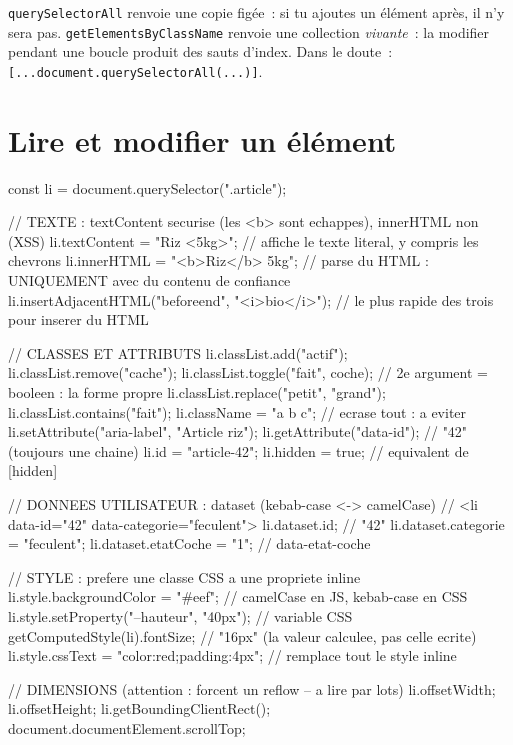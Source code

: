 \begin{note}
\texttt{querySelectorAll} renvoie une copie fig\'ee~: si tu ajoutes un \'el\'ement apr\`es, il n'y sera
pas. \texttt{getElementsByClassName} renvoie une collection \emph{vivante}~: la modifier pendant
une boucle produit des sauts d'index. Dans le doute~: \verb|[...document.querySelectorAll(...)]|.
\end{note}

\section{Lire et modifier un \'el\'ement}

\begin{codejs}
const li = document.querySelector(".article");

// TEXTE : textContent securise (les <b> sont echappes), innerHTML non (XSS)
li.textContent = "Riz <5kg>";              // affiche le texte literal, y compris les chevrons
li.innerHTML = "<b>Riz</b> 5kg";           // parse du HTML : UNIQUEMENT avec du contenu de confiance
li.insertAdjacentHTML("beforeend", "<i>bio</i>");  // le plus rapide des trois pour inserer du HTML

// CLASSES ET ATTRIBUTS
li.classList.add("actif"); li.classList.remove("cache");
li.classList.toggle("fait", coche);         // 2e argument = booleen : la forme propre
li.classList.replace("petit", "grand");
li.classList.contains("fait");
li.className = "a b c";                     // ecrase tout : a eviter
li.setAttribute("aria-label", "Article riz");
li.getAttribute("data-id");                 // "42" (toujours une chaine)
li.id = "article-42";
li.hidden = true;                           // equivalent de [hidden]

// DONNEES UTILISATEUR : dataset (kebab-case <-> camelCase)
// <li data-id="42" data-categorie="feculent">
li.dataset.id;                // "42"
li.dataset.categorie = "feculent";
li.dataset.etatCoche = "1";   // data-etat-coche

// STYLE : prefere une classe CSS a une propriete inline
li.style.backgroundColor = "#eef";          // camelCase en JS, kebab-case en CSS
li.style.setProperty("--hauteur", "40px");  // variable CSS
getComputedStyle(li).fontSize;              // "16px" (la valeur calculee, pas celle ecrite)
li.style.cssText = "color:red;padding:4px"; // remplace tout le style inline

// DIMENSIONS (attention : forcent un reflow -- a lire par lots)
li.offsetWidth; li.offsetHeight; li.getBoundingClientRect();
document.documentElement.scrollTop;
\end{codejs}

